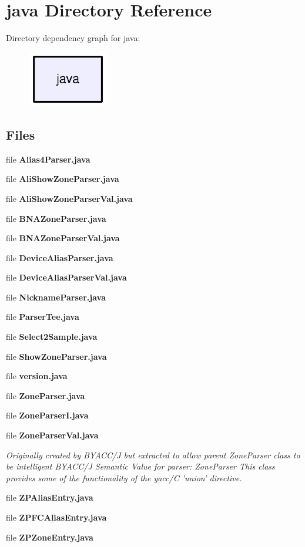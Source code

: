 \section{java Directory Reference}
\label{dir_93c6ba7fb77bae0709fae89c9c13b44a}
Directory dependency graph for java\-:\nopagebreak
\begin{figure}[H]
\begin{center}
\leavevmode
\includegraphics[width=98pt]{dir_93c6ba7fb77bae0709fae89c9c13b44a_dep}
\end{center}
\end{figure}
\subsection*{Files}
\begin{DoxyCompactItemize}
\item 
file {\bf Alias4\-Parser.\-java}
\item 
file {\bf Ali\-Show\-Zone\-Parser.\-java}
\item 
file {\bf Ali\-Show\-Zone\-Parser\-Val.\-java}
\item 
file {\bf B\-N\-A\-Zone\-Parser.\-java}
\item 
file {\bf B\-N\-A\-Zone\-Parser\-Val.\-java}
\item 
file {\bf Device\-Alias\-Parser.\-java}
\item 
file {\bf Device\-Alias\-Parser\-Val.\-java}
\item 
file {\bf Nickname\-Parser.\-java}
\item 
file {\bf Parser\-Tee.\-java}
\item 
file {\bf Select2\-Sample.\-java}
\item 
file {\bf Show\-Zone\-Parser.\-java}
\item 
file {\bf version.\-java}
\item 
file {\bf Zone\-Parser.\-java}
\item 
file {\bf Zone\-Parser\-I.\-java}
\item 
file {\bf Zone\-Parser\-Val.\-java}
\begin{DoxyCompactList}\small\item\em Originally created by B\-Y\-A\-C\-C/\-J but extracted to allow parent Zone\-Parser class to be intelligent B\-Y\-A\-C\-C/\-J Semantic Value for parser\-: Zone\-Parser This class provides some of the functionality of the yacc/\-C 'union' directive. \end{DoxyCompactList}\item 
file {\bf Z\-P\-Alias\-Entry.\-java}
\item 
file {\bf Z\-P\-F\-C\-Alias\-Entry.\-java}
\item 
file {\bf Z\-P\-Zone\-Entry.\-java}
\end{DoxyCompactItemize}
